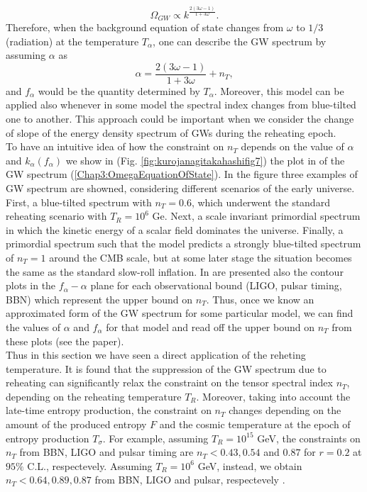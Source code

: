 \documentclass[11pt,a4paper,twoside]{book}
\begin{document}
\begin{equation}
	\label{Chap3:OmegaEquationOfState}
	\Omega_{GW} \propto k^{\frac{2(3\omega - 1)}{1+3\omega}}.
\end{equation}
Therefore, when the background equation of state changes from $ \omega $ to $ 1/3 $ (radiation) at the temperature $ T_{\alpha} $, one can describe the GW spectrum by assuming $\alpha$ as 
\begin{equation}
\label{Chap3:dependence}
\alpha = \frac{2(3\omega-1)}{1+3\omega}	+ n_{T},
\end{equation}
and $ f_{\alpha} $ would be the quantity determined by $ T_{\alpha} $.
Moreover, this model can be applied also whenever in some model the spectral index changes from blue-tilted one to another.
This approach could be important when we consider the change of slope of the energy density spectrum of GWs during the reheating epoch.\\
To have an intuitive idea of how the constraint on $ n_{T} $ depends on the value of $ \alpha $ and $ k_{\alpha} (f_{\alpha}) $ we show in (Fig. \ref{fig:kurojanagitakahashifig7}) the plot  in \cite{Chap3:BlueTiltedSpectrum} of the GW spectrum (\ref{Chap3:OmegaEquationOfState}). In the figure three examples of GW spectrum are showned, considering different scenarios of the early universe. First, a blue-tilted spectrum with $ n_{T} = 0.6 $, which underwent the standard reheating scenario with $ T_{R}=10^{6} $ Ge. Next, a scale invariant primordial spectrum in which the kinetic energy of a scalar field dominates the universe. Finally, a primordial spectrum  such that the model predicts a strongly blue-tilted spectrum of $ n_{T}=1 $ around the CMB scale, but at some later stage the situation becomes the same as the standard slow-roll inflation. 
In \cite{Chap3:BlueTiltedSpectrum} are presented also the contour plots in the $ f_{\alpha}-\alpha $ plane for each observational bound (LIGO, pulsar timing, BBN) which represent the upper bound on $ n_{T} $. Thus, once we know an approximated form  of the GW spectrum for some particular model, we can find the values of $\alpha$ and $ f_{\alpha} $ for that model and read off the upper bound on $ n_{T} $ from these plots (see the paper). \\
Thus in this section we have seen a direct application of the reheting temperature.  It is found that the suppression of the GW spectrum due to reheating can significantly relax the constraint on the tensor spectral index $ n_{T} $, depending on the reheating temperature $ T_{R} $. Moreover, taking into account the late-time entropy production, the constraint on $ n_{T} $ changes depending on the amount of the produced entropy $ F $ and the cosmic temperature at the epoch of entropy production $ T_{\sigma} $. For example, assuming $ T_{R}=10^{15}  $ GeV, the constraints on $ n_{T} $ from BBN, LIGO and pulsar timing are $ n_{T} < 0.43,0.54 $ and $ 0.87 $ for $ r=0.2 $ at $ 95 \% $ C.L., respectevely. Assuming $ T_{R}=10^{6} $ GeV, instead, we obtain $ n_{T}<0.64,0.89,0.87 $ from BBN, LIGO and pulsar, respectevely \cite{Chap3:BlueTiltedSpectrum}.\\
\end{document}
